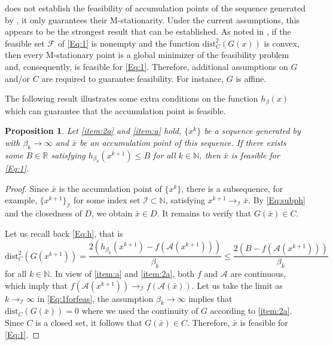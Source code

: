 \documentclass[11pt,a4paper,reqno]{amsart}
\newtheorem{proposition}[theorem]{Proposition}
\begin{document}
{ does not establish the feasibility of accumulation points of the sequence generated by , it only guarantees their M-stationarity. Under the current assumptions, this appears to be the strongest result that can be established. As noted in \cite{kanzow2023inexact}, if the feasible set $\mathcal F$ of \eqref{Eq:1} is nonempty and the function $\text{dist}_C^2(G(x))$ is convex, then every M-stationary point is a global minimizer of the feasibility problem and, consequently, is feasible for \eqref{Eq:1}. Therefore, additional assumptions on $G$ and/or $C$ are required to guarantee feasibility. For instance, $G$ is affine.

The following result illustrates some extra conditions on the function $h_{\beta}(x)$ which can guarantee that the accumulation point is feasible.
\begin{proposition}
    Let  \ref{item:2a} and \ref{item:a} hold, $\{x^k\}$ be a sequence generated by  with $\beta_k\to \infty$ and $\bar x$ be an accumulation point of this sequence. If there exists some $B\in \mathbb R$ satisfying $h_{\beta_k}(x^{k+1}) \leq B$ for all $k\in \mathbb N$, then $\bar x$ is feasible for \eqref{Eq:1}.
\end{proposition}
\begin{proof}
    Since $\bar x$ is the accumulation point of $\{x^k\}$, there is a subsequence, for example, $\{x^{k+1}\}_{\mathcal I}$ for some index set $\mathcal I \subset \mathbb N$, satisfying $x^{k+1} \to_{\mathcal I} \bar x$. By \eqref{Eq:subph} and the closedness of $D$, we obtain $\bar x\in D$. It remains to verify that $G(\bar x)\in C$.

    Let us recall back \eqref{Eq:h}, that is
    \begin{equation}\label{Eq:1forfeas}
        \text{dist}_C^2 (G(x^{k+1}))=\frac{2\left(h_{\beta_k}(x^{k+1})-f(\mathcal A(x^{k+1}))\right)}{\beta_k} \leq \frac{2\left(B-f(\mathcal A(x^{k+1}))\right)}{\beta_k}
    \end{equation}
    for all $k\in \mathbb N$. In view of \ref{item:a} and  \ref{item:2a}, both $f$ and $\mathcal A$ are continuous, which imply that $f(\mathcal A (x^{k+1}))\to_{\mathcal I} f(\mathcal A(\bar x))$. Let us take the limit as $k\to_{\mathcal I}\infty$ in \eqref{Eq:1forfeas}, the assumption $\beta_k \to \infty$ implies that $\text{dist}_C(G(\bar x))=0$ where we used the continuity of $G$ according to  \ref{item:2a}. Since $C$ is a closed set, it follows that $G(\bar x)\in C$. Therefore, $\bar x$ is feasible for \eqref{Eq:1}.
\end{proof}

}
\end{document}
